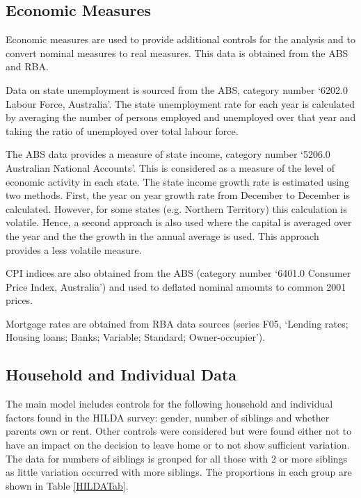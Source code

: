 \documentclass[12pt]{article}
\begin{document}
\subsection{Economic Measures}

Economic measures are used to provide additional controls for the analysis and to convert nominal measures to real measures. This data is obtained from the ABS and RBA.

Data on state unemployment is sourced from the ABS, category number `6202.0 Labour Force, Australia'. The state unemployment rate for each year is calculated by averaging the number of persons employed and unemployed over that year and taking the ratio of unemployed over total labour force.

The ABS data provides a measure of state income, category number `5206.0 Australian National Accounts'. This is considered as a measure of the level of economic activity in each state. The state income growth rate is estimated using two methods. First, the year on year growth rate from December to December is calculated. However, for some states (e.g. Northern Territory) this calculation is volatile. Hence, a second approach is also used where the capital is averaged over the year and the the growth in the annual average is used. This approach provides a less volatile measure.

CPI indices are also obtained from the ABS (category number `6401.0 Consumer Price Index, Australia') and used to deflated nominal amounts to common 2001 prices.

Mortgage rates are obtained from RBA data sources (series F05, `Lending rates; Housing loans; Banks; Variable; Standard; Owner-occupier').

\subsection{Household and Individual Data}

The main model includes controls for the following household and individual factors found in the HILDA survey: gender, number of siblings and whether parents own or rent.  Other controls were considered but were found either not to have an impact on the decision to leave home or to not show sufficient variation. The data for numbers of siblings is grouped for all those with 2 or more siblings as little variation occurred with more siblings. The proportions in each group are shown in Table \ref{HILDATab}.
\end{document}
